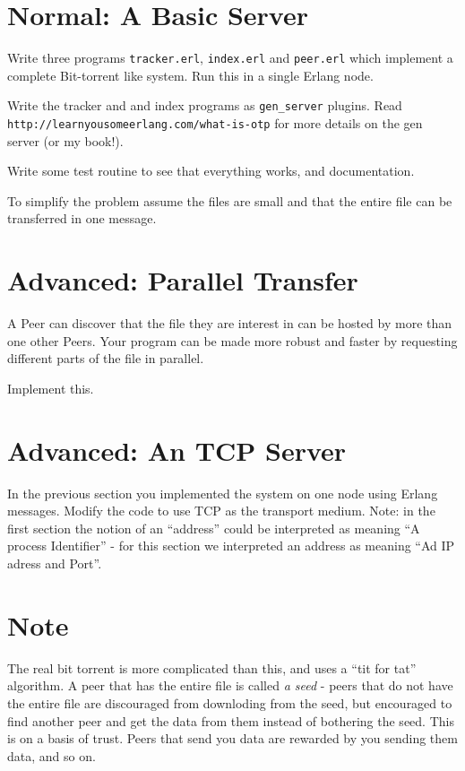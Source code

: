\documentclass[12pt]{hitec}
\begin{document}
\section{Normal: A Basic Server}

Write three programs \verb+tracker.erl+, \verb+index.erl+ and \verb+peer.erl+
which implement a complete Bit-torrent like system. Run this in a single Erlang node.

Write the tracker and and index programs as \verb+gen_server+ plugins.
Read \verb+http://learnyousomeerlang.com/what-is-otp+ for more details
on the gen server (or my book!).

Write some test routine to see that everything works, and documentation.

To simplify the problem assume the files are small and that the entire file
can be transferred in one message.

\section{Advanced: Parallel Transfer}

A Peer can discover that the file they are interest in can be hosted
by more than one other Peers. Your program can be made more robust and
faster by requesting different parts of the file in parallel.

Implement this.

\section{Advanced: An TCP Server}

In the previous section you implemented the system on one node using
Erlang messages.  Modify the code to use TCP as the transport
medium. Note: in the first section the notion of an ``address'' could
be interpreted as meaning ``A process Identifier'' - for this section
we interpreted an address as meaning ``Ad IP adress and Port''.


\section*{Note}

The real bit torrent is more complicated than this, and uses a ``tit
for tat'' algorithm.  A peer that has the entire file is called {\sl a
  seed} - peers that do not have the entire file are discouraged from
downloding from the seed, but encouraged to find another peer and get
the data from them instead of bothering the seed. This is on a basis
of trust. Peers that send you data are rewarded by you sending them
data, and so on.
\end{document}
